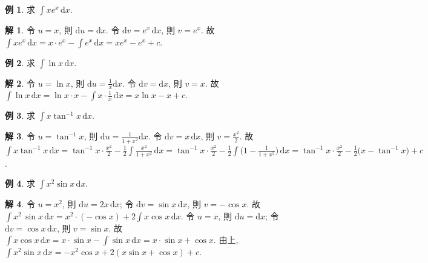 \documentclass[12pt]{extarticle}
\newcommand{\ds}{\displaystyle}
\theoremstyle{definition}
\newtheorem*{ex}{例}
\newtheorem*{sol}{解}
\begin{document}
\begin{ex}
  求 $\ds\int\!x e^{x}\,\text{d}x$. 
\end{ex}

\begin{sol}
  令 $u = x$, 則 $\ds\text{d}u = \text{d}x$. 令 $\ds\text{d}v = e^x\,\text{d}x$, 則 $\ds v = e^x$. 故 $\ds\int\!x e^{x}\,\text{d}x = x\cdot e^x - \int\!e^x\,\text{d}x = xe^x - e^x + c$. 
\end{sol}
    
\begin{ex}
  求 $\ds\int\!\ln x\,\text{d}x$. 
\end{ex}

\begin{sol}
  令 $\ds u = \ln x$, 則 $\ds\text{d}u = \frac{1}{x}\text{d}x$. 令 $\ds\text{d}v = \text{d}x$, 則 $v = x$. 故 $\ds\int\!\ln x\,\text{d}x = \ln x \cdot x - \int x\cdot\frac{1}{x}\,\text{d}x = x\ln x - x + c$. 
\end{sol}

\begin{ex}
  求 $\ds\int x\tan^{-1} x\,\text{d}x$. 
\end{ex}

\begin{sol}
  令 $\ds u = \tan^{-1} x$, 則 $\ds\text{d}u = \frac{1}{1 + x^2}\text{d}x$. 令 $\ds\text{d}v = x\,\text{d}x$, 則 $\ds v = \frac{x^2}{2}$. 故 $\ds\int x\tan^{-1} x\,\text{d}x = \tan^{-1} x\cdot\frac{x^2}{2} - \frac{1}{2}\int\!\frac{x^2}{1 + x^2}\,\text{d}x = \tan^{-1} x\cdot\frac{x^2}{2} - \frac{1}{2}\int\!\Big(1 - \frac{1}{1 + x^2}\Big)\,\text{d}x = \tan^{-1}x \cdot\frac{x^2}{2} - \frac{1}{2}\big(x - \tan^{-1} x\big) + c$. 
\end{sol}

\begin{ex}
  求 $\ds\int\!x^2\sin x\,\text{d}x$. 
\end{ex}

\begin{sol}
  令 $\ds u = x^2$, 則 $\ds\text{d}u = 2x\,\text{d}x$; 令 $\ds\text{d}v = \sin x\,\text{d}x$, 則 $\ds v = -\cos x$. 故 $\ds\int\!x^2\,\sin x\,\text{d}x = x^2\cdot(-\cos x) + 2 \int\!x \cos x\,\text{d}x$. 令 $\ds u = x$, 則 $\ds\text{d}u = \text{d}x$; 令 $\ds\text{d}v = \cos x\,\text{d}x$, 則 $\ds v = \sin x$. 故 $\ds\int\!x \cos x\,\text{d}x = x\cdot\sin x - \int\!\sin x\,\text{d}x = x\cdot\sin x + \cos x$. 由上, $\ds\int\!x^2\sin x\,\text{d}x = -x^2\cos x + 2 (x\sin x + \cos x) + c$. 
\end{sol}
    
\end{document}
